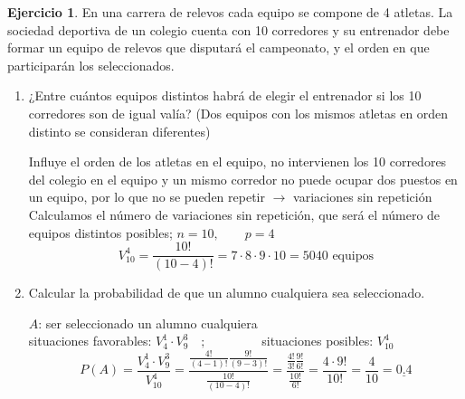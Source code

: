 \documentclass[a4paper, 12pt]{article}
\theoremstyle{definition}
\newtheorem{ej}{Ejercicio}
\begin{document}
\medskip

\begin{ej}
En una carrera de relevos cada equipo se compone de 4 atletas. La sociedad deportiva de un colegio cuenta con 10 corredores y su entrenador debe formar un equipo de relevos que disputará el
campeonato, y el orden en que participarán los seleccionados.
\begin{enumerate}[label=\textit{\alph*)}]
\item ¿Entre cuántos equipos distintos habrá de elegir el entrenador si los 10 corredores son de
igual valía? (Dos equipos con los mismos atletas en orden distinto se consideran diferentes)

\medskip

Influye el orden de los atletas en el equipo, no intervienen los 10 corredores del colegio en el equipo y un mismo corredor no puede ocupar dos puestos en un equipo, por lo que no se pueden repetir $\longrightarrow$ variaciones sin repetición \\
Calculamos el número de variaciones sin repetición, que será el número de equipos distintos posibles; $n = 10,\qquad p = 4$
\[V^4_{10} = \frac{10!}{(10-4)!} = 7\cdot8\cdot9\cdot10 = 5040\text{  equipos}\]
\item Calcular la probabilidad de que un alumno cualquiera sea seleccionado.

\medskip

$A$: ser seleccionado un alumno cualquiera \\
situaciones favorables: $V_4^1 \cdot V_9^3 \quad; \qquad\qquad$ situaciones posibles: $V_{10}^4$
\[P(A) = \frac{V_4^1 \cdot V_9^3}{V_{10}^4} = \frac{\frac{4!}{(4-1)!}\frac{9!}{(9-3)!}}{\frac{10!}{(10-4)!}} = \frac{\frac{4!}{3!}\frac{9!}{6!}}{\frac{10!}{6!}} = \frac{4\cdot 9!}{10!} = \frac{4}{10} = \underline{0.4}\]

\end{enumerate}
\end{ej}

\medskip
\end{document}
